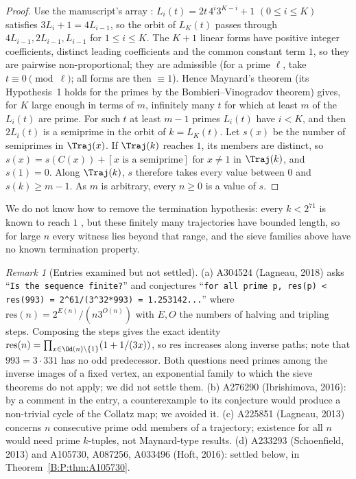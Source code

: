 \documentclass[11pt,a4paper]{article}
\theoremstyle{definition}
\theoremstyle{remark}
\newtheorem{remark}[theorem]{Remark}
\numberwithin{equation}{section}
\begin{document}
\begin{proof}
Use the manuscript's array \cite[Section~8.1]{R021}:
$L_i(t)=2t\,4^i3^{K-i}+1$ $(0\le i\le K)$ satisfies $3L_i+1=4L_{i-1}$, so the
orbit of $L_K(t)$ passes through $4L_{i-1},2L_{i-1},L_{i-1}$ for
$1\le i\le K$. The $K+1$ linear forms have positive integer coefficients, distinct leading
coefficients and the common constant term $1$, so they are pairwise
non-proportional; they are admissible (for a prime $\ell$, take
$t\equiv0\pmod\ell$; all forms are then $\equiv1$). Hence Maynard's theorem
\cite[Thm.~3.1]{R008} (its Hypothesis~1 holds for the primes by the Bombieri--Vinogradov theorem) gives, for $K$ large enough in terms of $m$, infinitely many
$t$ for which at least $m$ of the $L_i(t)$ are prime. For such $t$ at least
$m-1$ primes $L_i(t)$ have $i<K$, and then $2L_i(t)$ is a semiprime in the orbit
of $k=L_K(t)$. Let $s(x)$ be the number of semiprimes in $\Traj(x)$. If
$\Traj(k)$ reaches $1$, its members are distinct, so
$s(x)=s(C(x))+[x\text{ is a semiprime}]$ for $x\ne1$ in $\Traj(k)$, and $s(1)=0$.
Along $\Traj(k)$, $s$ therefore takes every value between $0$ and
$s(k)\ge m-1$. As $m$ is arbitrary, every $n\ge0$ is a value of $s$.
\end{proof}

We do not know how to remove the termination hypothesis: every
$k<2^{71}$ is known to reach $1$ \cite{R047,R048}, but these finitely many
trajectories have bounded length, so for large $n$ every witness lies beyond
that range, and the sieve families above have no known termination property.

\begin{remark}[Entries examined but not settled]\label{B:P:rem:others}
(a) A304524 \cite{R044} (Lagneau, 2018) asks ``\texttt{Is the sequence finite?}''
and conjectures ``\texttt{for all prime p, res(p) < res(993) =
2\^{}61/(3\^{}32*993) = 1.253142...}'' where
$\mathrm{res}(n)=2^{E(n)}/(n3^{O(n)})$ with $E,O$ the numbers of halving and
tripling steps. Composing the steps gives the exact identity
$\mathrm{res}(n)=\prod_{x\in\Od(n)\setminus\{1\}}(1+1/(3x))$, so $\mathrm{res}$
increases along inverse paths; note that $993=3\cdot331$ has no odd predecessor.
Both questions need primes among the inverse images of a fixed vertex, an
exponential family to which the sieve theorems do not apply; we did not settle
them.
(b) A276290 (Ibrishimova, 2016): by a comment in the entry, a counterexample to its conjecture would
produce a non-trivial cycle of the Collatz map; we avoided it.
(c) A225851 (Lagneau, 2013) concerns $n$ consecutive prime odd members of a
trajectory; existence for all $n$ would need prime $k$-tuples, not Maynard-type
results.
(d) A233293 (Schoenfield, 2013) and A105730, A087256, A033496 (Hoft, 2016):
settled below, in Theorem~\ref{B:P:thm:A105730}.
\end{remark}
\end{document}

